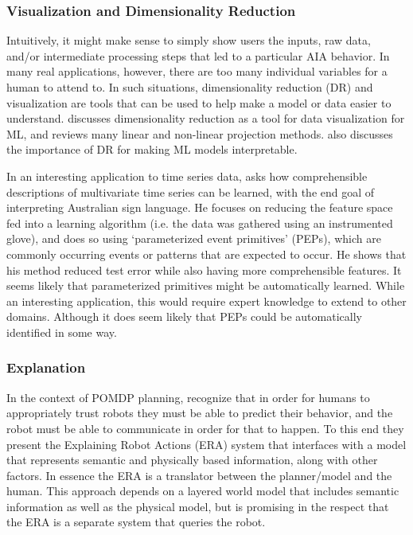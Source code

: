 \subsubsection{Visualization and Dimensionality Reduction} \label{sec:viz_dr}
    Intuitively, it might make sense to simply show users the inputs, raw data, and/or intermediate processing steps that led to a particular AIA behavior. In many real applications, however, there are too many individual variables for a human to attend to. In such situations, dimensionality reduction (DR) and visualization are tools that can be used to help make a model or data easier to understand. \citet{Venna2007-yj} discusses dimensionality reduction as a tool for data visualization for ML, and reviews many linear and non-linear projection methods. \citet{Vellido2012-nm} also discusses the importance of DR for making ML models interpretable.

    In an interesting application to time series data, \citet{Kadous1999-rx} asks how comprehensible descriptions of multivariate time series can be learned, with the end goal of interpreting Australian sign language. He focuses on reducing the feature space fed into a learning algorithm (i.e. the data was gathered using an instrumented glove), and does so using `parameterized event primitives' (PEPs), which are commonly occurring events or patterns that are expected to occur. He shows that his method reduced test error while also having more comprehensible features. It seems likely that parameterized primitives might be automatically learned. While an interesting application, this would require expert knowledge to extend to other domains. Although it does seem likely that PEPs could be automatically identified in some way.

\subsubsection{Explanation} \label{sec:explanation}
    In the context of POMDP planning, \citet{Lomas2012-ie} recognize that in order for humans to appropriately trust robots they must be able to predict their behavior, and the robot must be able to communicate in order for that to happen. To this end they present the Explaining Robot Actions (ERA) system that interfaces with a model that represents semantic and physically based information, along with other factors. In essence the ERA is a translator between the planner/model and the human. This approach depends on a layered world model that includes semantic information as well as the physical model, but is promising in the respect that the ERA is a separate system that queries the robot. 

